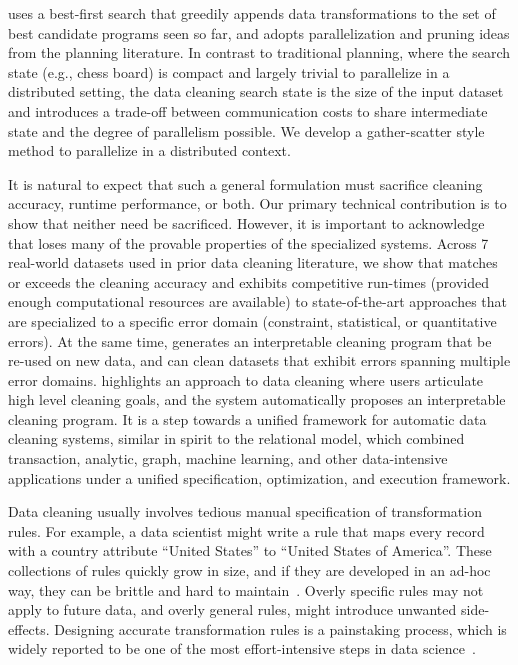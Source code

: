  \sys uses a best-first search that greedily appends data transformations to the set of best candidate programs seen so far, and adopts parallelization and pruning ideas from the planning literature.  In contrast to traditional planning, where the search state (e.g., chess board) is compact and largely trivial to parallelize in a distributed setting, the data cleaning search state is the size of the input dataset and introduces a trade-off between communication costs to share intermediate state and the degree of parallelism possible.  We develop a gather-scatter style method to parallelize \sys in a distributed context. 
 
 It is natural to expect that such a general formulation must sacrifice cleaning accuracy, runtime performance, or both.  Our primary technical contribution is to show that neither need be sacrificed. 
 However, it is important to acknowledge that \sys loses many of the provable properties of the specialized systems.
Across 7 real-world datasets used in prior data cleaning literature, we show that \sys matches or exceeds the cleaning accuracy and exhibits competitive run-times (provided enough computational resources are available) to state-of-the-art approaches that are specialized to a specific error domain (constraint, statistical, or quantitative errors).  At the same time, \sys generates an interpretable cleaning program that be re-used on new data, and can clean datasets that exhibit errors spanning multiple error domains. 
\sys highlights an approach to data cleaning where users articulate high level cleaning goals, and the system automatically proposes an interpretable cleaning program.  It is a step towards a unified framework for automatic data cleaning systems, similar in spirit to the relational model, which combined transaction, analytic, graph, machine learning, and other data-intensive applications under a unified specification, optimization, and execution framework.

















Data cleaning usually involves tedious manual specification of transformation rules.
For example, a data scientist might write a rule that maps every record with a \textsf{country} attribute ``United States'' to ``United States of America''.
These collections of rules quickly grow in size, and if they are developed in an ad-hoc way, they can be brittle and hard to maintain~\cite{krishnan2016hilda}.
Overly specific rules may not apply to future data, and overly general rules, might introduce unwanted side-effects.
Designing accurate transformation rules is a painstaking process, which is widely reported to be one of the most effort-intensive steps in data science~\cite{nytimes}.

